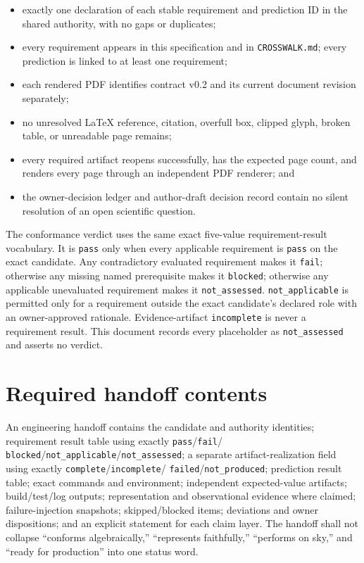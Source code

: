 \documentclass[10pt]{article}
\begin{document}
\begin{itemize}
\item exactly one declaration of each stable requirement and prediction ID in
the shared authority, with no gaps or duplicates;
\item every requirement appears in this specification and in
\texttt{CROSSWALK.md}; every prediction is linked to at least one requirement;
\item each rendered PDF identifies contract v0.2 and its current document
revision separately;
\item no unresolved LaTeX reference, citation, overfull box, clipped glyph,
broken table, or unreadable page remains;
\item every required artifact reopens successfully, has the expected page
count, and renders every page through an independent PDF renderer; and
\item the owner-decision ledger and author-draft decision record contain no
silent resolution of an open scientific question.
\end{itemize}

The conformance verdict uses the same exact five-value requirement-result
vocabulary. It is \texttt{pass} only when every applicable requirement is
\texttt{pass} on the exact candidate. Any contradictory evaluated requirement
makes it \texttt{fail}; otherwise any missing named prerequisite makes it
\texttt{blocked}; otherwise any applicable unevaluated requirement makes it
\texttt{not\_assessed}. \texttt{not\_applicable} is permitted only for a
requirement outside the exact candidate's declared role with an owner-approved
rationale. Evidence-artifact \texttt{incomplete} is never a requirement result.
This document records every placeholder as \texttt{not\_assessed} and asserts
no verdict.

\section{Required handoff contents}

An engineering handoff contains the candidate and authority identities;
requirement result table using exactly \texttt{pass}/\texttt{fail}/
\texttt{blocked}/\texttt{not\_applicable}/\texttt{not\_assessed}; a separate
artifact-realization field using exactly \texttt{complete}/\texttt{incomplete}/
\texttt{failed}/\texttt{not\_produced}; prediction result table; exact commands and
environment; independent expected-value artifacts; build/test/log outputs;
representation and observational evidence where claimed; failure-injection
snapshots; skipped/blocked items; deviations and owner dispositions; and an
explicit statement for each claim layer. The handoff shall not collapse
``conforms algebraically,'' ``represents faithfully,'' ``performs on sky,'' and
``ready for production'' into one status word.
\end{document}
